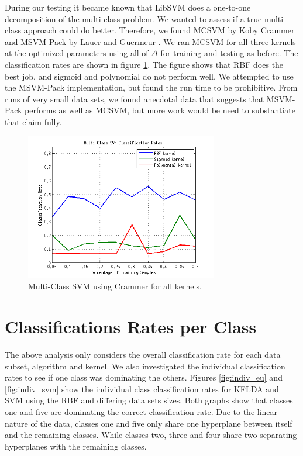 \documentclass[journal]{IEEEtran}
\begin{document}
\par During our testing it became known that LibSVM does a one-to-one decomposition of the multi-class problem. We wanted to assess if a true multi-class approach could do better. Therefore, we found MCSVM by Koby Crammer \cite{mcsvm} and MSVM-Pack by Lauer and Guermeur \cite{msvmpack}. We ran MCSVM for all three kernels at the optimized parameters using all of \(\Delta\) for training and testing as before. The classification rates are shown in figure \ref{fig:msvm_kernel}. The figure shows that RBF does the best job, and sigmoid and polynomial do not perform well. We attempted to use the MSVM-Pack implementation, but found the run time to be prohibitive. From runs of very small data sets, we found anecdotal data that suggests that MSVM-Pack performs as well as MCSVM, but more work would be need to substantiate that claim fully.

\begin{figure}[!h]
\centering
\includegraphics[width=3.3in]{../images/msvm_kernel_rates.png}
\caption{Multi-Class SVM using Crammer \cite{mcsvm} for all kernels.}
\label{fig:msvm_kernel}
\end{figure}

\section{Classifications Rates per Class}
\par The above analysis only considers the overall classification rate for each data subset, algorithm and kernel. We also investigated the individual classification rates to see if one class was dominating the others. Figures \ref{fig:indiv_eu} and \ref{fig:indiv_svm} show the individual class classification rates for KFLDA and SVM using the RBF and differing data sets sizes. Both graphs show that classes one and five are dominating the correct classification rate. Due to the linear nature of the data, classes one and five only share one hyperplane between itself and the remaining classes. While classes two, three and four share two separating hyperplanes with the remaining classes.
\end{document}
